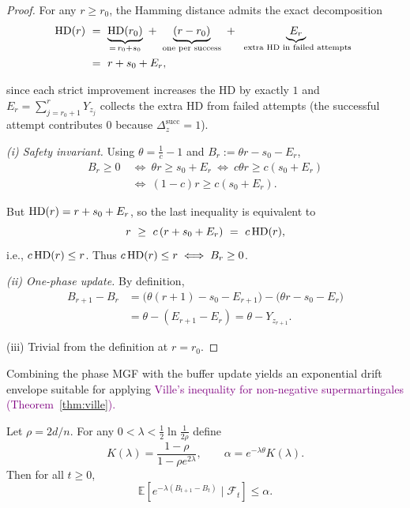 \begin{proof}
	For any $r\ge r_0$, the Hamming distance admits the exact decomposition
	\begin{align*}
		\HD(r)\ &=\ \underbrace{\HD(r_0)}_{=\,r_0+s_0}\ +\ \underbrace{(r-r_0)}_{\text{one per success}}\ +\ \underbrace{E_r}_{\text{ extra HD in failed attempts}}
		\ \\&=\ r+s_0+E_r,		
	\end{align*}
	
	since each strict improvement increases the HD by exactly $1$ and $E_r=\sum_{j=r_0+1}^r Y_{z_j}$ collects the extra HD from failed attempts (the successful attempt contributes $0$ because $\Delta_z^{\mathrm{succ}}=1$).
	
	\smallskip
	\emph{(i) Safety invariant.}
	Using $\theta=\tfrac{1}{c}-1$ and $B_r:=\theta r - s_0 - E_r$,
	\begin{align*}
		B_r\ge 0
		\ &\Longleftrightarrow\
		\theta r \ge s_0+E_r
		\ \Longleftrightarrow\
		c\theta r \ge c(s_0+E_r)
		\\ &\Longleftrightarrow\
		(1-c)r \ge c(s_0+E_r).	
	\end{align*}
	
	
	But $\text{HD}(r)=r+s_0+E_r$, so the last inequality is equivalent to
	\[
	r \ \ge\ c\,(r+s_0+E_r)\ =\ c\,\HD(r),
	\]
	i.e., $c\,\text{HD}(r)\le r$. Thus $c\,\text{HD}(r)\le r \iff B_r\ge 0$.
	
	\smallskip
	\emph{(ii) One-phase update.}
	By definition,
	\begin{align*}
		B_{r+1}-B_r
		&= \bigl(\theta(r+1)-s_0-E_{r+1}\bigr) - \bigl(\theta r - s_0 - E_r\bigr)
		\\&= \theta - (E_{r+1}-E_r)
		= \theta - Y_{z_{r+1}}.
	\end{align*}
	
	
	
	\smallskip
	(iii) Trivial from the definition at $r=r_0$.
\end{proof}

Combining the phase MGF with the buffer update yields an exponential drift 
envelope suitable for applying \textcolor{purple}{Ville's inequality for non-negative supermartingales (Theorem~\ref{thm:ville}).}

\begin{lemma}
	\label{lem:drift-envelope-global}
	Let $\rho=2d/n$.  
	For any $0<\lambda<\tfrac12\ln\tfrac{1}{2\rho}$ define
	\[
	K(\lambda)=\frac{1-\rho}{1-\rho e^{2\lambda}}, 
	\qquad 
	\alpha=e^{-\lambda\theta}K(\lambda).
	\]
	Then for all $t\ge0$,
	\[
	\mathbb{E}[e^{-\lambda(B_{t+1}-B_t)}\mid\mathcal{F}_t]\le \alpha.
	\]
\end{lemma}

